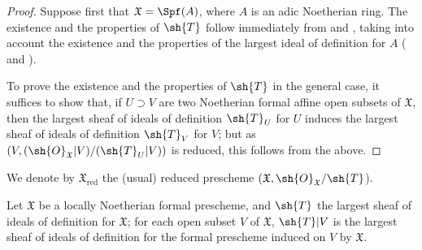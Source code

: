 \begin{proof}
Suppose first that $\mathfrak{X}=\Spf(A)$, where $A$ is an adic Noetherian ring.
The existence and the properties of $\sh{T}$ follow immediately from   and , taking into account the existence and the properties of the largest ideal of definition for $A$ ( and ).

To prove the existence and the properties of $\sh{T}$ in the general case, it suffices to show that, if $U\supset V$ are two Noetherian formal affine open subsets of $\mathfrak{X}$, then the largest sheaf of ideals of definition $\sh{T}_U$ for $U$ induces the largest sheaf of ideals of definition $\sh{T}_V$ for $V$; but as $(V,(\sh{O}_\mathfrak{X}|V)/(\sh{T}_U|V))$ is reduced, this follows from the above.
\end{proof}

We denote by $\mathfrak{X}_\text{red}$ the (usual) reduced prescheme $(\mathfrak{X},\sh{O}_\mathfrak{X}/\sh{T}$).

\begin{corollary}[10.5.5]
\label{I.10.5.5}
Let $\mathfrak{X}$ be a locally Noetherian formal prescheme, and $\sh{T}$ the largest sheaf of ideals of definition for $\mathfrak{X}$; for each open subset $V$ of $\mathfrak{X}$, $\sh{T}|V$ is the largest sheaf of ideals of definition for the formal prescheme induced on $V$ by $\mathfrak{X}$.
\end{corollary}



